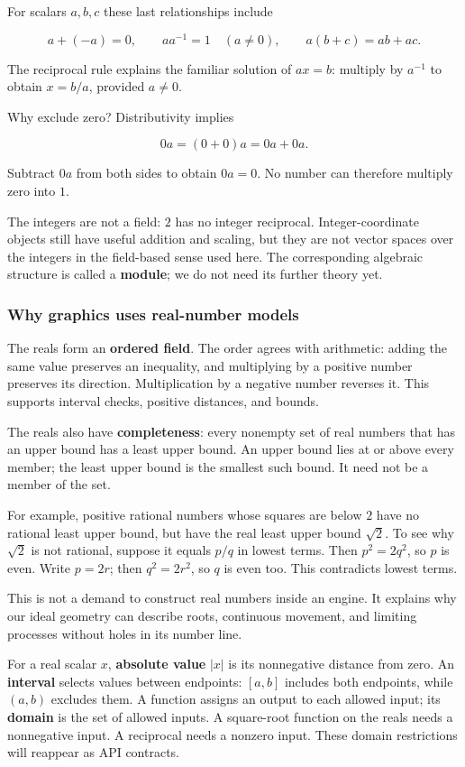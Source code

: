 For scalars \(a,b,c\) these last relationships include

\[
a+(-a)=0,\qquad aa^{-1}=1\quad(a\ne0),\qquad a(b+c)=ab+ac.
\]

The reciprocal rule explains the familiar solution of \(ax=b\): multiply by \(a^{-1}\) to obtain \(x=b/a\), provided \(a\ne0\).

Why exclude zero? Distributivity implies

\[
0a=(0+0)a=0a+0a.
\]

Subtract \(0a\) from both sides to obtain \(0a=0\). No number can therefore multiply zero into \(1\).

The integers are not a field: \(2\) has no integer reciprocal. Integer-coordinate objects still have useful addition and scaling, but they are not vector spaces over the integers in the field-based sense used here. The corresponding algebraic structure is called a \textbf{module}; we do not need its further theory yet.

\subsubsection{Why graphics uses real-number models}\label{why-graphics-uses-real-number-models}

The reals form an \textbf{ordered field}. The order agrees with arithmetic: adding the same value preserves an inequality, and multiplying by a positive number preserves its direction. Multiplication by a negative number reverses it. This supports interval checks, positive distances, and bounds.

The reals also have \textbf{completeness}: every nonempty set of real numbers that has an upper bound has a least upper bound. An upper bound lies at or above every member; the least upper bound is the smallest such bound. It need not be a member of the set.

For example, positive rational numbers whose squares are below \(2\) have no rational least upper bound, but have the real least upper bound \(\sqrt2\). To see why \(\sqrt2\) is not rational, suppose it equals \(p/q\) in lowest terms. Then \(p^2=2q^2\), so \(p\) is even. Write \(p=2r\); then \(q^2=2r^2\), so \(q\) is even too. This contradicts lowest terms.

This is not a demand to construct real numbers inside an engine. It explains why our ideal geometry can describe roots, continuous movement, and limiting processes without holes in its number line.

For a real scalar \(x\), \textbf{absolute value} \(|x|\) is its nonnegative distance from zero. An \textbf{interval} selects values between endpoints: \([a,b]\) includes both endpoints, while \((a,b)\) excludes them. A function assigns an output to each allowed input; its \textbf{domain} is the set of allowed inputs. A square-root function on the reals needs a nonnegative input. A reciprocal needs a nonzero input. These domain restrictions will reappear as API contracts.

